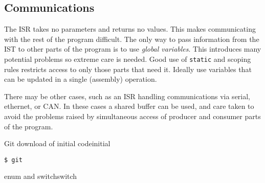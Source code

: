 \documentclass[12pt]{tufte-handout}
\begin{document}
\subsection{Communications}
The ISR takes no parameters and returns no values.  This makes
communicating with the rest of the program difficult.  The only way to
pass information from the IST to other parts of the program is to use
\emph{global variables}.  This introduces many potential problems so
extreme care is needed.  Good use of \texttt{static} and scoping rules
restricts access to only those parts that need it.  Ideally use 
variables that can be updated in a single (assembly) operation.

There may be other cases, such as an ISR handling communications via
serial, ethernet, or CAN.  In these cases a shared buffer can be used,
and care taken to avoid the problems raised by simultaneous access of
producer and consumer parts of the program.

\begin{exercise}{Git download of initial code}{initial}
\begin{verbatim}
$ git
\end{verbatim}
\end{exercise}
\begin{question}{enum and switch}{switch}
\begin{tcolorbox}[colframe=red!50!black,title=Solution]
\end{tcolorbox}
\end{question}




\clearpage
\appendix
\end{document}

